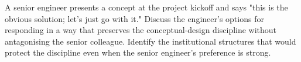 \begin{exercise}
A senior engineer presents a concept at the project kickoff and says "this is the obvious solution; let's just go with it." Discuss the engineer's options for responding in a way that preserves the conceptual-design discipline without antagonising the senior colleague. Identify the institutional structures that would protect the discipline even when the senior engineer's preference is strong.
\end{exercise}
